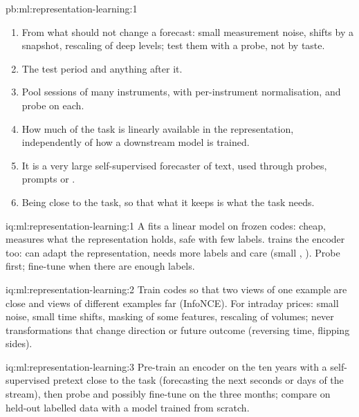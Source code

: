 \begin{solution}{pb:ml:representation-learning:1}
\begin{enumerate}
\item From what should not change a forecast: small measurement noise, shifts by a snapshot, rescaling of deep levels; test
them with a probe, not by taste.
\item The test period and anything after it.
\item Pool sessions of many instruments, with per-instrument normalisation, and probe on each.
\item How much of the task is linearly available in the representation, independently of how a downstream model is
trained.
\item It is a very large self-supervised forecaster of text, used through probes, prompts or .
\item Being close to the task, so that what it keeps is what the task needs.
\end{enumerate}
\end{solution}

\begin{solution}{iq:ml:representation-learning:1}
A  fits a linear model on frozen codes: cheap, measures what the representation holds, safe with few labels.
 trains the encoder too: can adapt the representation, needs more labels and care (small , ). Probe first; fine-tune when there are enough labels.
\end{solution}

\begin{solution}{iq:ml:representation-learning:2}
Train codes so that two views of one example are close and views of different examples far (InfoNCE). For intraday
prices: small noise, small time shifts, masking of some features, rescaling of volumes; never transformations that change
direction or future outcome (reversing time, flipping sides).
\end{solution}

\begin{solution}{iq:ml:representation-learning:3}
Pre-train an encoder on the ten years with a self-supervised pretext close to the task (forecasting the next seconds or
days of the stream), then probe and possibly fine-tune on the three months; compare on held-out labelled data with a model
trained from scratch.
\end{solution}

